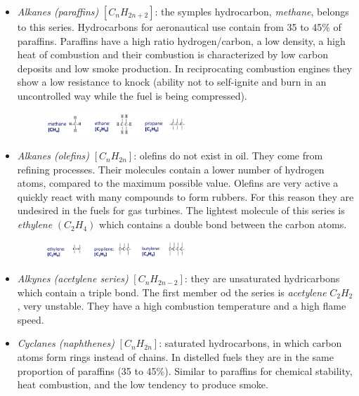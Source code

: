 \documentclass[12pt]{article}
\begin{document}
\begin{itemize}
    \item \textit{Alkanes (paraffins)} $[C_{n}H_{2n+2}]$: the symples hydrocarbon, \textit{methane}, belongs to this series. Hydrocarbons for aeronautical use contain from 35 to 45\% of paraffins. Paraffins have a high ratio hydrogen/carbon, a low density, a high heat of combustion and their combustion is characterized by low carbon deposits and low smoke production. In reciprocating combustion engines they show a low resistance to knock (ability not to self-ignite and burn in an uncontrolled way while the fuel is being compressed).
    
\begin{figure}[h!]
\centering
\includegraphics[width=0.5\textwidth]{figures/paraffins.png}
\end{figure}

    \item \textit{Alkanes (olefins)} $[C_{n}H_{2n}]$: olefins do not exist in oil. They come from refining processes. Their molecules contain a lower number of hydrogen atoms, compared to the maximum possible value. Olefins are very active a quickly react with many compounds to form rubbers. For this reason they are undesired in the fuels for gas turbines. The lightest molecule of this series is \textit{ethylene} $(C_{2}H_{4})$ which contains a double bond between the carbon atoms.
    
\begin{figure}[h!]
\centering
\includegraphics[width=0.5\textwidth]{figures/olefins.png}
\end{figure}    
    
    \item \textit{Alkynes (acetylene series)} $[C_{n}H_{2n-2}]$: they are unsaturated hydricarbons which contain a triple bond. The first member od the series is \textit{acetylene} $C_{2}H_{2}$, very unstable. They have a high combustion temperature and a high flame speed.
    \item \textit{Cyclanes (naphthenes)} $[C_{n}H_{2n}]$: saturated hydrocarbons, in which carbon atoms form rings instead of chains. In distelled fuels they are in the same proportion of paraffins (35 to 45\%). Similar to paraffins for chemical stability, heat combustion, and the low tendency to produce smoke.
    

\end{itemize}
\end{document}
